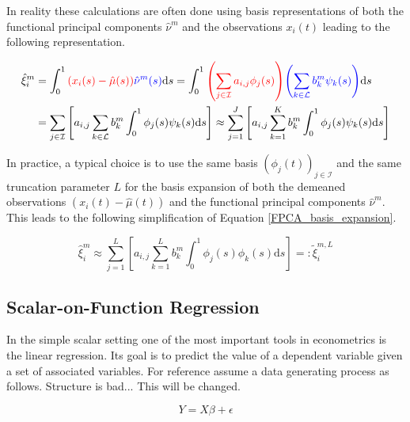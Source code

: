 \documentclass[11pt,twoside,a4paper]{article}
\begin{document}
	In reality these calculations are often done using basis representations of both the functional principal components $\hat{\nu}^m$ and the observations $x_i(t)$ leading to the following representation.
	
	\begin{equation}\label{FPCA_basis_expansion}
		\begin{split}
			\hat{\xi}_{i}^m & = \int_{0}^{1} {\color{red}\left( x_i(s) - \hat{\mu}(s)\right)} {\color{blue}\hat{\nu}^m(s)} \mathrm{d}s
			= \int_{0}^{1} {\color{red}\left(\sum_{j \in \mathcal{I}} a_{i,j} \phi_j(s)\right)} {\color{blue}\left(\sum_{k \in \mathcal{L}} b_{k}^m \psi_{k}(s)\right)} \mathrm{d}s \\
			& = \sum_{j \in \mathcal{I}} \left[ a_{i,j}\sum_{k \in \mathcal{L}} b_{k}^m \int_{0}^{1} \phi_j(s) \psi_{k}(s)\mathrm{d}s\right] \approx \sum_{j = 1}^{J} \left[a_{i,j}\sum_{k = 1}^{K} b_{k}^m \int_{0}^{1} \phi_j(s) \psi_{k}(s)\mathrm{d}s \right]
		\end{split}
	\end{equation}
	
	In practice, a typical choice is to use the same basis $\left(\phi_j(t)\right)_{j \in \mathcal{I}}$ and the same truncation parameter $L$ for the basis expansion of both the demeaned observations $\left(x_i(t) - \hat{\mu}(t)\right)$ and the functional principal components $\hat{\nu}^m$. This leads to the following simplification of Equation \ref{FPCA_basis_expansion}.
	
	\begin{equation}\label{score_approx}
		\hat{\xi}_{i}^m \approx \sum_{j = 1}^{L} \left[ a_{i,j}\sum_{k = 1}^{L} b_{k}^m \int_{0}^{1} \phi_j(s) \phi_{k}(s)\mathrm{d}s\right] =: \tilde{\xi}^{m,L}_{i}
	\end{equation}
	
	\subsection{Scalar-on-Function Regression}
	In the simple scalar setting one of the most important tools in econometrics is the linear regression. Its goal is to predict the value of a dependent variable given a set of associated variables. For reference assume a data generating process as follows. {\color{red} Structure is bad... This will be changed.}
	
	\begin{equation}
		Y = X\beta + \epsilon
	\end{equation}
	
\end{document}
